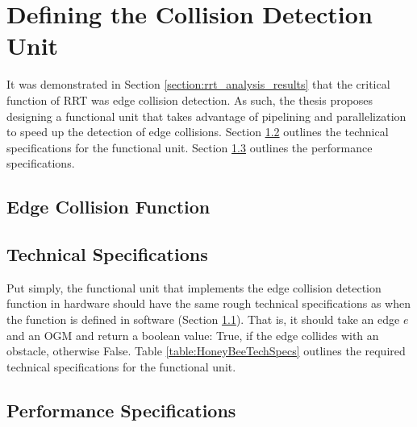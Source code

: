 
\section{Defining the Collision Detection Unit}

    It was demonstrated in Section \ref{section:rrt_analysis_results} that the critical function of \gls{RRT} was edge collision detection. As such, the thesis proposes designing a functional unit that takes advantage of pipelining and parallelization to speed up the detection of edge collisions. Section \ref{subsection:HoneyBeeTechSpechs} outlines the technical specifications for the functional unit. Section \ref{subsection:HoneyBeePerfSpechs} outlines the performance specifications.

    \subsection{Edge Collision Function}
    \label{subsection:EdgeCollisionFunction}
   
    \subsection{Technical Specifications}
    \label{subsection:HoneyBeeTechSpechs}
        Put simply, the functional unit that implements the edge collision detection function in hardware should have the same rough technical specifications as when the function is defined in software (Section \ref{subsection:EdgeCollisionFunction}). That is, it should take an edge $e$ and an \gls{OGM} and return a boolean value: True, if the edge collides with an obstacle, otherwise False.
        Table \ref{table:HoneyBeeTechSpecs} outlines the required technical specifications for the functional unit.
        

    \subsection{Performance Specifications}
    \label{subsection:HoneyBeePerfSpechs}

